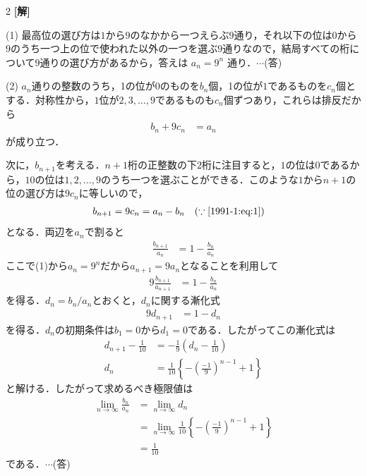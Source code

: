 \documentclass[../../main.tex]{subfiles}
\begin{document}
\setcounter{equation}{0}
\setcounter{figure}{0}
\setcounter{table}{0}
\begin{oframed}
  
\end{oframed}
\setlength{\columnseprule}{0.4pt}
\begin{multicols}{2}
  {\bf[解]}

  (1) 最高位の選び方は$1$から$9$のなかから一つえらぶ$9$通り，それ以下の位は$0$から$9$のうち一つ上の位で使われた以外の一つを選ぶ$9$通りなので，結局すべての桁について$9$通りの選び方があるから，答えは $a_n=9^n$ 通り．$\cdots$(答)

  \vspace{10pt}
  (2)
  $a_n$通りの整数のうち，1の位が$0$のものを$b_n$個，1の位が$1$であるものを$c_n$個とする．対称性から，$1$位が$2,3,\dots,9$であるものも$c_n$個ずつあり，これらは排反だから
  \begin{align}\label{1991-1:eq:1}
    b_n+9c_n & = a_n
  \end{align}
  が成り立つ．

  次に，$b_{n+1}$を考える．$n+1$桁の正整数の下$2$桁に注目すると，$1$の位は$0$であるから，$10$の位は$1,2,\dots,9$のうち一つを選ぶことができる．このような$1$から$n+1$の位の選び方は$9c_n$に等しいので，
  \begin{align*}
    b_{n+1} & = 9c_n = a_n-b_n \quad (\because \text{\cref{1991-1:eq:1}})
  \end{align*}
  となる．両辺を$a_n$で割ると
  \begin{align*}
    \frac{b_{n+1}}{a_n} & = 1-\frac{b_n}{a_n}
  \end{align*}
  ここで(1)から$a_n=9^n$だから$a_{n+1}=9 a_{n}$となることを利用して
  \begin{align*}
    9\frac{b_{n+1}}{a_{n+1}} & = 1-\frac{b_n}{a_n}
  \end{align*}
  を得る．$d_n=b_{n}/a_{n}$とおくと，$d_n$に関する漸化式
  \begin{align*}
    9d_{n+1} & = 1-d_n
  \end{align*}
  を得る．$d_n$の初期条件は$b_1=0$から$d_1=0$である．したがってこの漸化式は
  \begin{align*}
    d_{n+1}-\frac{1}{10} & = -\frac{1}{9}\left(d_n-\frac{1}{10}\right)                      \\
    d_n                  & = \frac{1}{10} \left\{-\left(\frac{-1}{9}\right)^{n-1}+1\right\}
  \end{align*}
  と解ける．したがって求めるべき極限値は
  \begin{align*}
    \lim_{n \to \infty} \frac{b_n}{a_n} & = \lim_{n \to \infty} d_n                                                           \\
                                        & = \lim_{n \to \infty} \frac{1}{10}\left\{-\left(\frac{-1}{9}\right)^{n-1}+1\right\} \\
                                        & = \frac{1}{10}
  \end{align*}
  である．$\cdots$(答)


\end{multicols}
\end{document}
